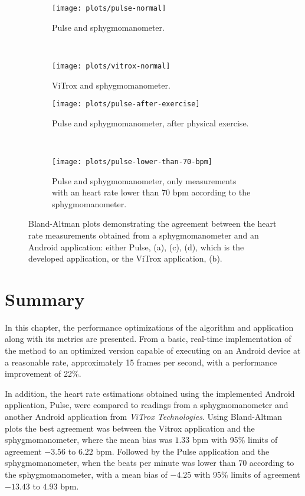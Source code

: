 \begin{figure}[p]
  \begin{subfigure}{0.5\textwidth}
    \texttt{[image: plots/pulse-normal]}
    \caption{Pulse and sphygmomanometer.}
    \label{fig:plots:heart:pulse:normal}
  \end{subfigure}
  ~
  \begin{subfigure}{0.5\textwidth}
    \texttt{[image: plots/vitrox-normal]}
    \caption{ViTrox and sphygmomanometer.}
    \label{fig:plots:heart:vitrox:normal}
  \end{subfigure}

  \begin{subfigure}{0.5\textwidth}
    \texttt{[image: plots/pulse-after-exercise]}
    \caption{Pulse and sphygmomanometer, after physical exercise.}
    \label{fig:plots:heart:pulse:exercise}
  \end{subfigure}
  ~
  \begin{subfigure}{0.5\textwidth}
    \texttt{[image: plots/pulse-lower-than-70-bpm]}
    \caption{
      Pulse and sphygmomanometer, only measurements with an heart rate lower
      than 70 bpm according to the sphygmomanometer.
    }
    \label{fig:plots:heart:pulse:low}
  \end{subfigure}

  \caption{
    Bland-Altman plots demonstrating the agreement between the heart rate
    measurements obtained from a sphygmomanometer and an Android application:
    either Pulse, (a), (c), (d), which is the developed application,
    or the ViTrox application, (b).
  }
  \label{fig:plots:heart}
\end{figure}

\section{Summary}

In this chapter, the performance optimizations of the algorithm and application
along with its metrics are presented. From a basic, real-time
implementation of the \evm{} method to an optimized version capable of
executing on an Android device at a reasonable rate, approximately
15 frames per second, with a performance improvement of 22\%.

In addition, the heart rate estimations obtained using the
implemented Android application, Pulse, were compared to readings
from a sphygmomanometer and another Android application from
\emph{ViTrox Technologies}. Using Bland-Altman plots the best agreement
was between the Vitrox application and the sphygmomanometer, where the mean
bias was $1.33$ bpm with 95\% limits of agreement $-3.56$ to $6.22$ bpm.
Followed by the Pulse application and the sphygmomanometer, when the
beats per minute was lower than 70 according to the sphygmomanometer, with a
mean bias of $-4.25$ with 95\% limits of agreement $-13.43$ to $4.93$ bpm.
